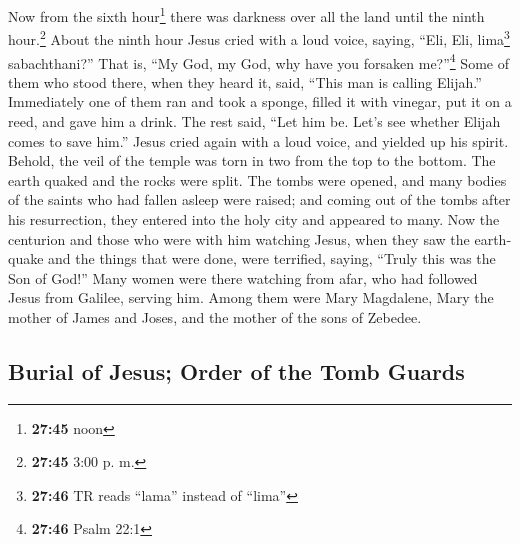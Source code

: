 \begin{paracol}{2}
\begin{otherlanguage}{english}
 Now from the sixth hour\footnote{\textbf{27:45} noon}
there was darkness over all the land until the ninth hour.\footnote{\textbf{27:45}
  3:00 p. m.}  About the ninth hour Jesus cried with a
loud voice, saying, ``Eli, Eli, lima\footnote{\textbf{27:46} TR reads
  ``lama'' instead of ``lima''} sabachthani?'' That is, ``My God, my
God, why have you forsaken me?''\footnote{\textbf{27:46} Psalm 22:1}
 Some of them who stood there, when they heard it, said,
``This man is calling Elijah.''  Immediately one of them
ran and took a sponge, filled it with vinegar, put it on a reed, and
gave him a drink.  The rest said, ``Let him be. Let's see
whether Elijah comes to save him.''  Jesus cried again
with a loud voice, and yielded up his spirit.  Behold,
the veil of the temple was torn in two from the top to the bottom. The
earth quaked and the rocks were split.  The tombs were
opened, and many bodies of the saints who had fallen asleep were raised;
 and coming out of the tombs after his resurrection, they
entered into the holy city and appeared to many.  Now the
centurion and those who were with him watching Jesus, when they saw the
earthquake and the things that were done, were terrified, saying,
``Truly this was the Son of God!''  Many women were there
watching from afar, who had followed Jesus from Galilee, serving him.
 Among them were Mary Magdalene, Mary the mother of James
and Joses, and the mother of the sons of Zebedee.

\hypertarget{burial-of-jesus-order-of-the-tomb-guards}{%
\subsection{Burial of Jesus; Order of the Tomb
Guards}\label{burial-of-jesus-order-of-the-tomb-guards}}


\end{otherlanguage}
\end{paracol}
